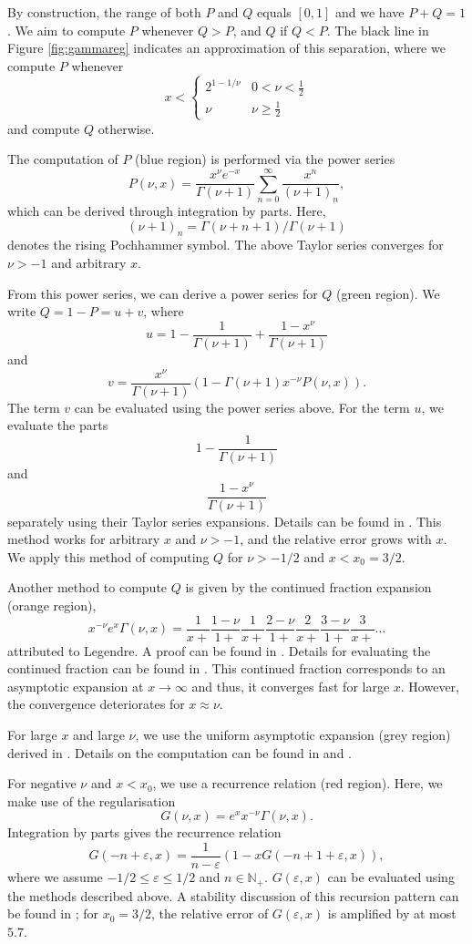 \documentclass[]{amsart}
\numberwithin{mythm}{section}
\begin{document}
By construction,
the range of both $P$ and $Q$ equals $[0, 1]$ and we have $P + Q = 1$.
We aim to compute $P$ whenever $Q>P$, and $Q$ if $Q<P$. 
The black line in 
Figure \ref{fig:gammareg} indicates an approximation of this separation, where we
compute $P$ whenever
\[
x <
\begin{cases}
2^{1-1/\nu}&0 < \nu < \frac{1}{2}\\
\nu &\nu \geq \frac{1}{2}
\end{cases}
\]
and compute $Q$ otherwise.


The computation of $P$ (blue region) is performed via the power series
\[P(\nu, x) = \frac{x^\nu e^{-x}}{\Gamma(\nu + 1)} \sum_{n = 0}^\infty \frac{x^n}{(\nu + 1)_n},\]
which can be derived through integration by parts. 
Here, 
$$(\nu + 1)_n = \Gamma(\nu + n + 1) / \Gamma(\nu + 1)$$ 
denotes the rising Pochhammer symbol.
The above Taylor series converges for $\nu > -1$ and arbitrary $x$. 

From this power series, we can derive a power series for $Q$ (green region). 
We write $Q = 1-P = u+v$, where
\[u = 1 - \frac{1}{\Gamma(\nu+1)} + \frac{1-x^\nu}{\Gamma(\nu+1)}\]
and
\[v = \frac{x^\nu}{\Gamma(\nu+1)} (1 - \Gamma(\nu+1) x^{-\nu} P(\nu, x)).\]
The term $v$ can be evaluated using the power series above. 
For the term $u$, we evaluate the parts
\[1 - \frac{1}{\Gamma(\nu+1)}\]
and
\[\frac{1-x^\nu}{\Gamma(\nu+1)}\]
separately using their Taylor series expansions.
Details can be found in \cite{gautschi}.
This method works for arbitrary $x$ and $\nu > -1$, and the relative error grows with $x$.
We apply this method of computing $Q$ for $\nu > -1/2$ and $x < x_0 = 3/2$.

Another method to compute $Q$ is given by the continued fraction expansion (orange region),
\[x^{-\nu} e^x \Gamma(\nu, x) = \frac{1}{x+} \frac{1-\nu}{1+} \frac{1}{x+} \frac{2-\nu}{1+} \frac{2}{x+} \frac{3-\nu}{1+} \frac{3}{x+} \dots\]
attributed to Legendre. A proof can be found in \cite{wall}. Details for evaluating the continued fraction can be found in \cite{gautschi}. This continued fraction corresponds to an asymptotic expansion at 
$x \to \infty$ and thus, it converges fast for large $x$. However, the convergence deteriorates for $x \approx \nu$.

For large $x$ and large $\nu$, we use the uniform asymptotic expansion (grey region) derived in \cite{temme1}. Details on the computation can be found in \cite{gil} and \cite{temme3}.

For negative $\nu$ and $x < x_0$, we use a recurrence relation (red region). Here, we make use of the regularisation
\[G(\nu, x) = e^x x^{-\nu} \Gamma(\nu, x).\]
Integration by parts gives the recurrence relation
\[G(-n+\varepsilon, x) = \frac{1}{n-\varepsilon} (1 - x G(-n+1+\varepsilon, x)),\]
where we assume $-1/2 \leq \varepsilon \leq 1/2$ and $n \in \mathds{N}_+$. $G(\varepsilon, x)$ can be evaluated using the methods described above. A stability discussion of this recursion pattern can be found in \cite{gautschi}; for $x_0=3/2$, the relative error of $G(\varepsilon, x)$ is amplified by at most $5.7$.
\end{document}
